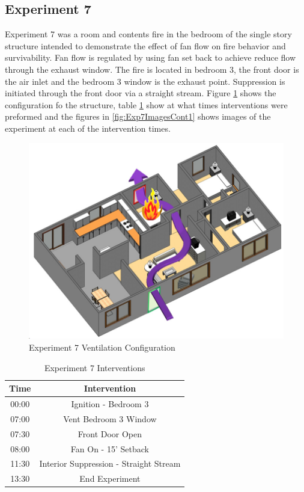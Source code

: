 \documentclass{article}
\begin{document}
\subsection{Experiment 7}
Experiment 7 was a room and contents fire in the bedroom of the single story structure intended to demonstrate the effect of fan flow on fire behavior and survivability. Fan flow is regulated by using fan set back to achieve reduce flow through the exhaust window. The fire is located in bedroom 3, the front door is the air inlet and the bedroom 3 window is the exhaust point. Suppression is initiated through the front door via a straight stream. Figure \ref{fig:Exp7VentConfig} shows the configuration fo the structure, table \ref{Table:Exp7Interventions} show at what times interventions were preformed and the figures in \ref{fig:Exp7ImagesCont1} shows images of the experiment at each of the intervention times.

\begin{figure}[h!]
	\centering
	\includegraphics[width=5in]{0_Images/FireExperiments/Single_Story/Experiment_7.jpg}
	\caption{Experiment 7 Ventilation Configuration}
	\label{fig:Exp7VentConfig}
\end{figure}


\begin{table}[H]
	\centering
	\caption{Experiment 7 Interventions}
	\begin{tabular}{|c|c|} 
		\hline
		Time & Intervention \\ \hline \hline
		00:00 & Ignition - Bedroom 3 \\ \hline
		07:00 & Vent Bedroom 3 Window \\ \hline
		07:30 & Front Door Open \\ \hline
		08:00 & Fan On - 15' Setback \\ \hline
		11:30 & Interior Suppression - Straight Stream\\ \hline
		13:30 & End Experiment\\ \hline
	\end{tabular}
	\label{Table:Exp7Interventions}
\end{table}
\end{document}
